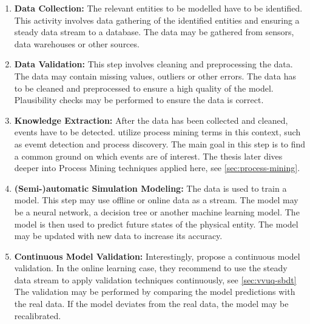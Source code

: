 \begin{enumerate}
  \item \textbf{Data Collection:} The relevant entities to be modelled have to be identified. This activity involves data gathering of the identified entities and ensuring a steady data stream to a database. The data may be gathered from sensors, data warehouses or other sources.
  \item \textbf{Data Validation:} This step involves cleaning and preprocessing the data. The data may contain missing values, outliers or other errors. The data has to be cleaned and preprocessed to ensure a high quality of the model. Plausibility checks may be performed to ensure the data is correct.
  \item \textbf{Knowledge Extraction:} After the data has been collected and cleaned, events have to be detected.  utilize process mining terms in this context, such as evemt detection and process discovery. The main goal in this step is to find a common ground on which events are of interest. The thesis later dives deeper into Process Mining techniques applied here, see \autoref{sec:process-mining}.
  \item \textbf{(Semi-)automatic Simulation Modeling:} The data is used to train a model. This step may use offline or online data as a stream. The model may be a neural network, a decision tree or another machine learning model. The model is then used to predict future states of the physical entity. The model may be updated with new data to increase its accuracy.
  \item \textbf{Continuous Model Validation:} Interestingly,\citeauthor{francis2021towards} propose a continuous model validation. In the online learning case, they recommend to use the steady data stream to apply validation techniques continuously, see \autoref{sec:vvuq-sbdt} The validation may be performed by comparing the model predictions with the real data. If the model deviates from the real data, the model may be recalibrated.
\end{enumerate}

